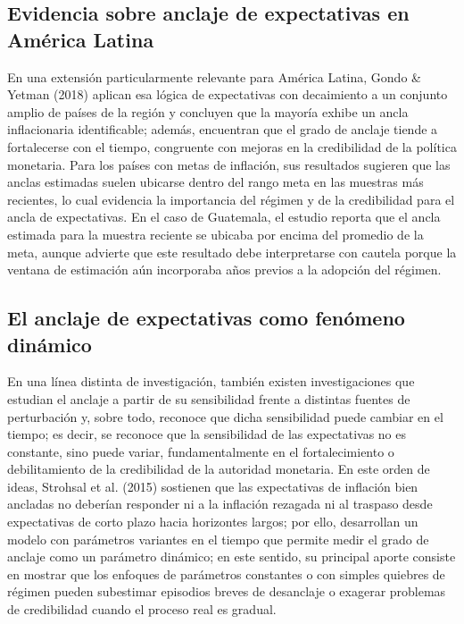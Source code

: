 \documentclass[
  10.5pt,
  letterpaper,
  twocolumn]{article}
\begin{document}
\subsection{Evidencia sobre anclaje de expectativas en América
Latina}\label{evidencia-sobre-anclaje-de-expectativas-en-amuxe9rica-latina}

En una extensión particularmente relevante para América Latina, Gondo \&
Yetman (2018) aplican esa lógica de expectativas con decaimiento a un
conjunto amplio de países de la región y concluyen que la mayoría exhibe
un ancla inflacionaria identificable; además, encuentran que el grado de
anclaje tiende a fortalecerse con el tiempo, congruente con mejoras en
la credibilidad de la política monetaria. Para los países con metas de
inflación, sus resultados sugieren que las anclas estimadas suelen
ubicarse dentro del rango meta en las muestras más recientes, lo cual
evidencia la importancia del régimen y de la credibilidad para el ancla
de expectativas. En el caso de Guatemala, el estudio reporta que el
ancla estimada para la muestra reciente se ubicaba por encima del
promedio de la meta, aunque advierte que este resultado debe
interpretarse con cautela porque la ventana de estimación aún
incorporaba años previos a la adopción del régimen.

\subsection{El anclaje de expectativas como fenómeno
dinámico}\label{el-anclaje-de-expectativas-como-fenuxf3meno-dinuxe1mico}

En una línea distinta de investigación, también existen investigaciones
que estudian el anclaje a partir de su sensibilidad frente a distintas
fuentes de perturbación y, sobre todo, reconoce que dicha sensibilidad
puede cambiar en el tiempo; es decir, se reconoce que la sensibilidad de
las expectativas no es constante, sino puede variar, fundamentalmente en
el fortalecimiento o debilitamiento de la credibilidad de la autoridad
monetaria. En este orden de ideas, Strohsal et al. (2015) sostienen que
las expectativas de inflación bien ancladas no deberían responder ni a
la inflación rezagada ni al traspaso desde expectativas de corto plazo
hacia horizontes largos; por ello, desarrollan un modelo con parámetros
variantes en el tiempo que permite medir el grado de anclaje como un
parámetro dinámico; en este sentido, su principal aporte consiste en
mostrar que los enfoques de parámetros constantes o con simples quiebres
de régimen pueden subestimar episodios breves de desanclaje o exagerar
problemas de credibilidad cuando el proceso real es gradual.
\end{document}
